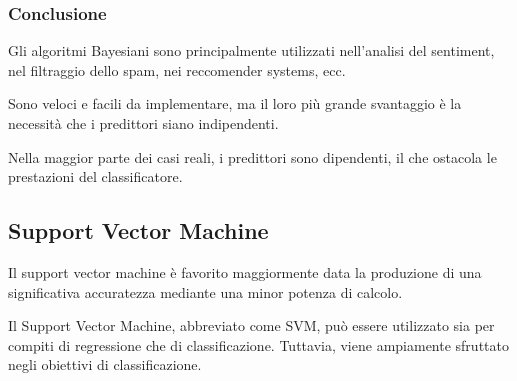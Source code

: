\subsubsection{Conclusione}
Gli algoritmi Bayesiani sono principalmente utilizzati nell'analisi del sentiment, nel filtraggio dello spam, nei reccomender systems, ecc. 

Sono veloci e facili da implementare, ma il loro più grande svantaggio è la necessità che i predittori siano indipendenti. 

Nella maggior parte dei casi reali, i predittori sono dipendenti, il che ostacola le prestazioni del classificatore.
\newpage

\subsection{Support Vector Machine}
Il support vector machine è favorito maggiormente data la produzione di una significativa accuratezza mediante una minor potenza di calcolo. 

Il Support Vector Machine, abbreviato come SVM, può essere utilizzato sia per compiti di regressione che di classificazione. Tuttavia, viene ampiamente sfruttato negli obiettivi di classificazione.
